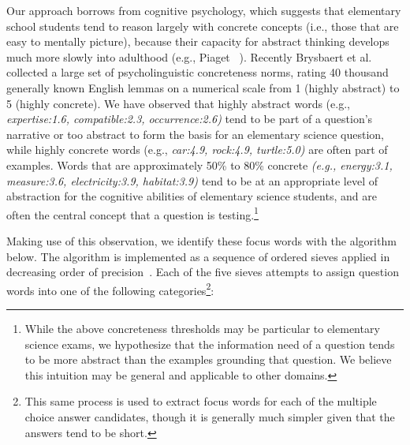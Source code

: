 Our approach borrows from cognitive psychology, which suggests that elementary school students tend to reason largely with concrete concepts (i.e., those that are easy to mentally picture), because their capacity for abstract thinking develops much more slowly into adulthood (e.g., Piaget ~\citeyear{Piaget1954}).  Recently Brysbaert et al. ~\citeyear{brysbaert:2014} collected a large set of psycholinguistic concreteness norms, rating 40 thousand generally known English lemmas on a numerical scale from 1 (highly abstract) to 5 (highly concrete).  We have observed that highly abstract words (e.g., {\em expertise:1.6, compatible:2.3, occurrence:2.6)} tend to be part of a question's narrative or too abstract to form the basis for an elementary science question, while highly concrete words (e.g., {\em  car:4.9, rock:4.9, turtle:5.0)} are often part of examples.  Words that are approximately 50\% to 80\% concrete {\em (e.g., energy:3.1, measure:3.6, electricity:3.9, habitat:3.9)} tend to be at an appropriate level of abstraction for the cognitive abilities of elementary science students, and are often the central concept that a question is testing.\footnote{
While the above concreteness thresholds may be particular to elementary science exams, we hypothesize that the information need of a question tends to be more abstract than the examples grounding that question.  We believe this intuition may be general and applicable to other domains.
}

Making use of this observation, we identify these focus words with the algorithm below. The algorithm is implemented as a sequence of ordered sieves applied in decreasing order of precision~\cite{Lee:13}. Each of the five sieves attempts to assign question words into one of the following categories\footnote{This same process is used to extract focus words for each of the multiple choice answer candidates, though it is generally much simpler given that the answers tend to be short.}: 

